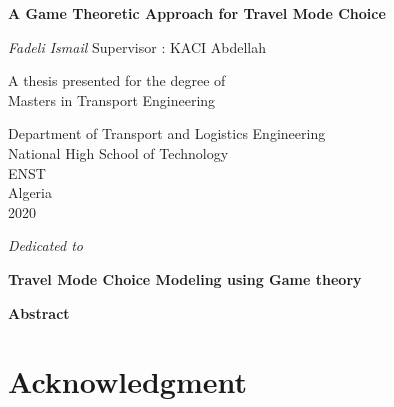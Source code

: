 \documentclass[12pt]{report}
\newenvironment{dedication}
  {\clearpage           %
   \thispagestyle{empty}%
   \vspace*{\stretch{1}}%
   \itshape             %
   \raggedleft          %
  }
  {\par %
   \vspace{\stretch{3}} %
   \clearpage           %
  }
\def\blankpage{%
      \clearpage%
      \thispagestyle{empty}%
      \addtocounter{page}{-1}%
      \null%
      \clearpage}
\begin{document}
\begin{titlepage}

   \begin{center}
   \thisfancypage{%
\setlength{\fboxsep}{10pt}\doublebox}{}
       \vspace*{1cm}
 	   \Huge
       \textbf{A Game Theoretic Approach for Travel Mode Choice}
		\LARGE
		
       \vspace{0.5cm}
        
            
       \vspace{1.5cm}

       \textit{Fadeli Ismail}
\vfill
\normalsize
Supervisor : KACI Abdellah\\

       \vfill
       
            	\normalsize
       A thesis presented for the degree of\\
       Masters in Transport Engineering
            
       \vspace{0.8cm}
     
       
            \Large
       Department of Transport and Logistics Engineering\\
       National High School of Technology \\
       ENST\\
       Algeria\\
       2020
            
   \end{center}
   

\end{titlepage}
\blankpage
\begin{dedication}\thispagestyle{empty}
Dedicated to 
\end{dedication}
\clearpage
\thispagestyle{empty}
\thispagestyle{plain}
\begin{center}
    \Large
    \textbf{Travel Mode Choice Modeling using Game theory}
        
    \vspace{0.4cm}
    \large
   
        
    \vspace{0.4cm}
    
       
    \vspace{0.9cm}
    \textbf{Abstract}
\end{center}

\clearpage
\section*{Acknowledgment}\thispagestyle{empty}
\clearpage
\tableofcontents \thispagestyle{empty}
\listoffigures
{}
\clearpage
\end{document}
